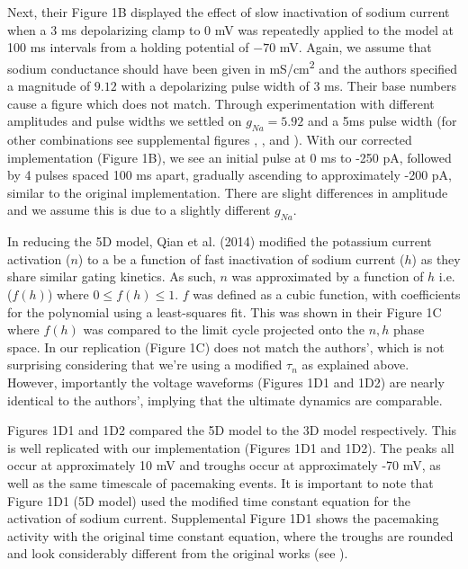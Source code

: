 Next, their Figure 1B displayed the effect of slow inactivation of sodium current when a 3 ms depolarizing clamp to 0 mV was repeatedly applied to the model at 100 ms intervals from a holding potential of $-70$ mV. Again, we assume that sodium conductance should have been given in mS/cm\textsuperscript{2} and the authors specified a magnitude of $9.12$ with a depolarizing pulse width of 3 ms. Their base numbers cause a figure which does not match. Through experimentation with different amplitudes and pulse widths we settled on $g_{Na}=5.92$ and a 5ms pulse width (for other combinations see supplemental figures , , and ). With our corrected implementation (Figure 1B), we see an initial pulse at 0 ms to -250 pA, followed by 4 pulses spaced 100 ms apart, gradually ascending to approximately -200 pA, similar to the original implementation. There are slight differences in amplitude and we assume this is due to a slightly different $g_{Na}$.

In reducing the 5D model, Qian et al. (2014) modified the potassium current activation ($n$) to a be a function of fast inactivation of sodium current ($h$) as they share similar gating kinetics. As such, $n$ was approximated by a function of $h$ i.e. ($f(h)$) where $0\leq f(h)\leq 1$. $f$ was defined as a cubic function, with coefficients for the polynomial using a least-squares fit. This was shown in their Figure 1C where $f(h)$ was compared to the limit cycle projected onto the $n, h$ phase space. In our replication (Figure 1C) does not match the authors', which is not surprising considering that we're using a modified $\tau_n$ as explained above. However, importantly the voltage waveforms (Figures 1D1 and 1D2) are nearly identical to the authors', implying that the ultimate dynamics are comparable. 

Figures 1D1 and 1D2 compared the 5D model to the 3D model respectively. This is well replicated with our implementation (Figures 1D1 and 1D2). The peaks all occur at approximately 10 mV and troughs occur at approximately -70 mV, as well as the same timescale of pacemaking events. It is important to note that Figure 1D1 (5D model) used the modified time constant equation for the activation of sodium current. Supplemental Figure 1D1 shows the pacemaking activity with the original time constant equation, where the troughs are rounded and look considerably different from the original works (see ).

